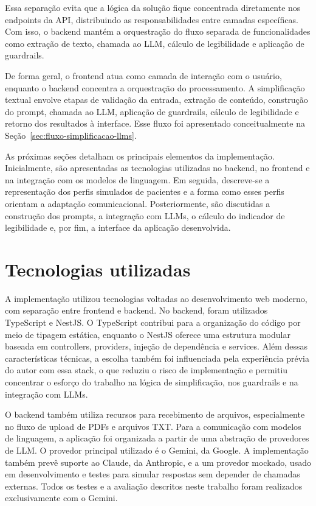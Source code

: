 Essa separação evita que a lógica da solução fique concentrada diretamente nos endpoints da API, distribuindo as responsabilidades entre camadas específicas. Com isso, o backend mantém a orquestração do fluxo separada de funcionalidades como extração de texto, chamada ao LLM, cálculo de legibilidade e aplicação de guardrails.

De forma geral, o frontend atua como camada de interação com o usuário, enquanto o backend concentra a orquestração do processamento. A simplificação textual envolve etapas de validação da entrada, extração de conteúdo, construção do prompt, chamada ao LLM, aplicação de guardrails, cálculo de legibilidade e retorno dos resultados à interface. Esse fluxo foi apresentado conceitualmente na Seção~\ref{sec:fluxo-simplificacao-llms}.

As próximas seções detalham os principais elementos da implementação. Inicialmente, são apresentadas as tecnologias utilizadas no backend, no frontend e na integração com os modelos de linguagem. Em seguida, descreve-se a representação dos perfis simulados de pacientes e a forma como esses perfis orientam a adaptação comunicacional. Posteriormente, são discutidas a construção dos prompts, a integração com LLMs, o cálculo do indicador de legibilidade e, por fim, a interface da aplicação desenvolvida.

\section{Tecnologias utilizadas}
\label{sec:tecnologias-utilizadas}

A implementação utilizou tecnologias voltadas ao desenvolvimento web moderno, com separação entre frontend e backend. No backend, foram utilizados TypeScript e NestJS. O TypeScript contribui para a organização do código por meio de tipagem estática, enquanto o NestJS oferece uma estrutura modular baseada em controllers, providers, injeção de dependência e services. Além dessas características técnicas, a escolha também foi influenciada pela experiência prévia do autor com essa stack, o que reduziu o risco de implementação e permitiu concentrar o esforço do trabalho na lógica de simplificação, nos guardrails e na integração com LLMs.

O backend também utiliza recursos para recebimento de arquivos, especialmente no fluxo de upload de PDFs e arquivos TXT. Para a comunicação com modelos de linguagem, a aplicação foi organizada a partir de uma abstração de provedores de LLM. O provedor principal utilizado é o Gemini, da Google. A implementação também prevê suporte ao Claude, da Anthropic, e a um provedor mockado, usado em desenvolvimento e testes para simular respostas sem depender de chamadas externas. Todos os testes e a avaliação descritos neste trabalho foram realizados exclusivamente com o Gemini. 

